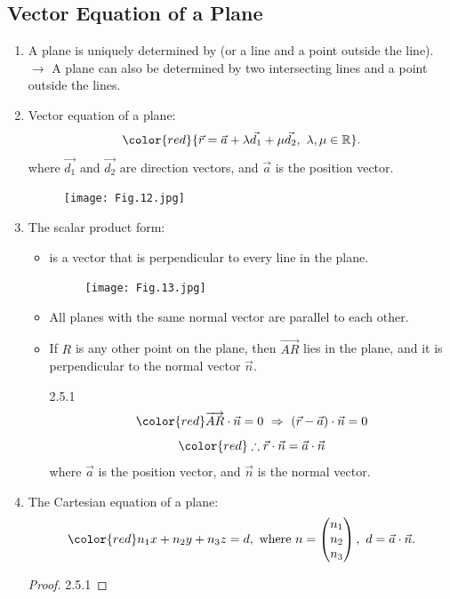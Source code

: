 \documentclass[12pt, a4paper]{article}
\begin{document}
\subsection{Vector Equation of a Plane}
\begin{enumerate}
  \item A plane is uniquely determined by {\color{red}{three points}} (or a line and a point outside the line).\\
  $\rightarrow$ A plane can also be determined by two intersecting lines and a point outside the lines. 
  \item Vector equation of a plane: 
  $${\color{red}{\vec{r}=\vec{a}+\lambda\vec{d_1}+\mu\vec{d_2},\ \lambda,\mu\in\mathbb{R}}}.$$
  where $\vec{d_1}$ and $\vec{d_2}$ are direction vectors, and $\vec{a}$ is the position vector. 
  \begin{figure}[H]
    \centering
    \texttt{[image: Fig.12.jpg]}
  \end{figure}
  \item The scalar product form: 
  \begin{itemize}
    \item \textbf{\color{red}{Normal vector}} is a vector that is perpendicular to every line in the plane. 
    \begin{figure}[H]
      \centering
      \texttt{[image: Fig.13.jpg]}
    \end{figure}
    \item All planes with the same normal vector are parallel to each other. 
    \item If $R$ is any other point on the plane, then $\overrightarrow{AR}$ lies in the plane, and it is perpendicular to the normal vector $\vec{n}$.
    \begin{theorem}{2.5.1}{}
      $$\color{red} \overrightarrow{AR}\cdot\vec{n}=0\ \Rightarrow\ \left(\vec{r}-\vec{a}\right)\cdot\vec{n}=0$$
      $$\color{red} \therefore \vec{r}\cdot\vec{n}=\vec{a}\cdot\vec{n}$$
      where $\vec{a}$ is the position vector, and $\vec{n}$ is the normal vector. 
    \end{theorem}
  \end{itemize}
  \item The Cartesian equation of a plane: 
  $${\color{red}n_1x+n_2y+n_3z=d},\ \text{where }n=\begin{pmatrix}n_1\\n_2\\n_3\end{pmatrix},\ d=\vec{a}\cdot\vec{n}.$$
  \begin{proof}{2.5.1}{}

\end{proof}
\end{enumerate}
\end{document}
